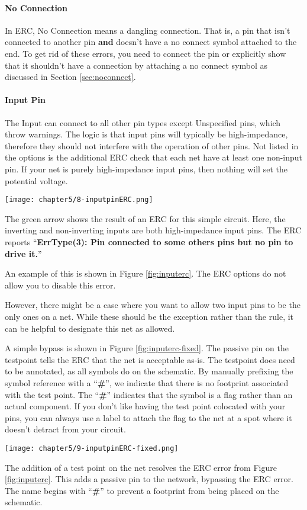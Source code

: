 \paragraph{No Connection} In ERC, No Connection means a dangling connection.
That is, a pin that isn't connected to another pin \textbf{and} doesn't have a no connect symbol attached to the end.
To get rid of these errors, you need to connect the pin or explicitly show that it shouldn't have a connection by attaching a no connect symbol as discussed in Section \ref{sec:noconnect}.

\paragraph{Input Pin} The Input can connect to all other pin types except Unspecified pins, which throw warnings.
The logic is that input pins will typically be high-impedance, therefore they should not interfere with the operation of other pins.
Not listed in the options is the additional ERC check that each net have at least one non-input pin.
If your net is purely high-impedance input pins, then nothing will set the potential voltage.

\begin{marginfigure}
	\texttt{[image: chapter5/8-inputpinERC.png]}
	\caption[Error on input pins]{
		The green arrow shows the result of an ERC for this simple circuit.
		Here, the inverting and non-inverting inputs are both high-impedance input pins.
		The ERC reports ``\textbf{ErrType(3): Pin connected to some others pins but no pin to drive it.}''
	}
	\label{fig:inputerc}
\end{marginfigure}
An example of this is shown in Figure \ref{fig:inputerc}.
The ERC options do not allow you to disable this error.

However, there might be a case where you want to allow two input pins to be the only ones on a net.
While these should be the exception rather than the rule, it can be helpful to designate this net as allowed.

A simple bypass is shown in Figure \ref{fig:inputerc-fixed}.
The passive pin on the testpoint tells the ERC that the net is acceptable as-is.
The testpoint does need to be annotated, as all symbols do on the schematic.
By manually prefixing the symbol reference with a ``\textbf{\#}'', we indicate that there is no footprint associated with the test point.
The ``\textbf{\#}'' indicates that the symbol is a flag rather than an actual component.
If you don't like having the test point colocated with your pins, you can always use a label to attach the flag to the net at a spot where it doesn't detract from your circuit.
\begin{marginfigure}
	\texttt{[image: chapter5/9-inputpinERC-fixed.png]}
	\caption[Allowing only input pins]{
		The addition of a test point on the net resolves the ERC error from Figure \ref{fig:inputerc}.
		This adds a passive pin to the network, bypassing the ERC error.
		The name begins with ``\textbf{\#}'' to prevent a footprint from being placed on the schematic.
	}
	\label{fig:inputerc-fixed}
\end{marginfigure}

